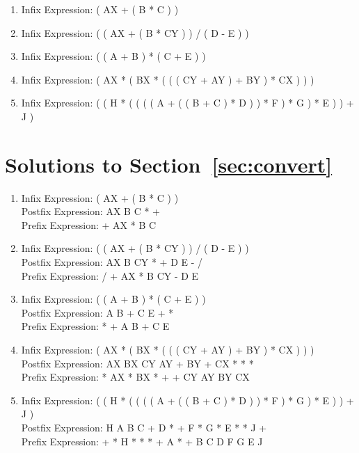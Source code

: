 \documentclass{pset_template}
\begin{document}
\begin{enumerate}
\item Infix Expression: ( AX + ( B * C ) )

\item Infix Expression: ( ( AX + ( B * CY ) ) / ( D - E ) )

\item Infix Expression: ( ( A + B ) * ( C + E ) )

\item Infix Expression: ( AX * ( BX * ( ( ( CY + AY ) + BY ) * CX ) ) )

\item Infix Expression: ( ( H * ( ( ( ( A + ( ( B + C ) * D ) ) * F ) * G ) * E ) ) + J )
\end{enumerate}

\newpage
\section{Solutions to Section~\ref{sec:convert}}

\begin{enumerate}
\item
Infix Expression: ( AX + ( B * C ) )
\\
Postfix Expression: AX B C * +
\\
Prefix Expression: + AX * B C

\item
Infix Expression: ( ( AX + ( B * CY ) ) / ( D - E ) )
\\
Postfix Expression: AX B CY * + D E - /
\\
Prefix Expression: / + AX * B CY - D E

\item
Infix Expression: ( ( A + B ) * ( C + E ) )
\\
Postfix Expression: A B + C E + *
\\
Prefix Expression: * + A B + C E

\item
Infix Expression: ( AX * ( BX * ( ( ( CY + AY ) + BY ) * CX ) ) )
\\
Postfix Expression: AX BX CY AY + BY + CX * * *
\\
Prefix Expression: * AX * BX * + + CY AY BY CX

\item
Infix Expression: ( ( H * ( ( ( ( A + ( ( B + C ) * D ) ) * F ) * G ) * E ) ) + J )
\\
Postfix Expression: H A B C + D * + F * G * E * * J +
\\
Prefix Expression: + * H * * * + A * + B C D F G E J
\end{enumerate}
\end{document}
